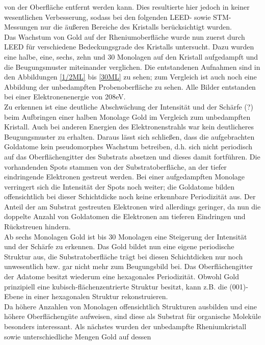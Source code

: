 von der Oberfläche entfernt werden kann. Dies resultierte hier jedoch in keiner wesentlichen
Verbesserung, sodass bei den folgenden LEED- sowie STM-Messungen nur die äußeren Bereiche des
Kristalls berücksichtigt wurden.\\
Das Wachstum von Gold auf der Rheniumoberfläche wurde nun zuerst durch LEED für
verschiedene Bedeckungsgrade des Kristalls untersucht. Dazu wurden eine halbe, eine, sechs, zehn und
30 Monolagen auf den Kristall aufgedampft und die Beugungsmuster miteinander verglichen. Die
entstandenen Aufnahmen sind in den Abbildungen \ref{1/2ML} bis \ref{30ML} zu sehen; zum Vergleich
ist auch noch eine Abbildung der unbedampften Probenoberfläche zu sehen. Alle Bilder entstanden
bei einer Elektronenenergie von 208eV.\\
Zu erkennen ist eine deutliche Abschwächung der Intensität und der Schärfe (?) beim Aufbringen einer
halben Monolage Gold im Vergleich zum unbedampften Kristall. Auch bei anderen Energien des
Elektronenstrahls war kein deutlicheres Beugungsmuster zu erhalten. Daraus lässt sich schließen,
dass die aufgebrachten Goldatome kein pseudomorphes Wachstum betreiben, d.h. sich nicht periodisch
auf das Oberflächengitter des Substrats absetzen und dieses damit fortführen. Die vorhandenden Spots
stammen von der Substratoberfläche, an der tiefer eindringende Elektronen gestreut werden. Bei einer
aufgedampften Monolage verringert sich die Intensität der Spots noch weiter; die Goldatome bilden
offensichtlich bei dieser Schichtdicke noch keine erkennbare Periodizität aus. Der Anteil der am
Substrat gestreuten Elektronen wird allerdings geringer, da nun die doppelte Anzahl von Goldatomen
die Elektronen am tieferen Eindringen und Rückstreuen hindern.\\
Ab sechs Monolagen Gold ist bis 30 Monolagen eine Steigerung der Intensität und der Schärfe zu
erkennen. Das Gold bildet nun eine eigene periodische Struktur aus, die Substratoberfläche trägt
bei diesen Schichtdicken nur noch unwesentlich bzw. gar nicht mehr zum Beugungsbild bei. Das
Oberflächengitter der Adatome besitzt wiederum eine hexagonales Periodizität. Obwohl Gold
prinzipiell eine kubisch-flächenzentrierte Struktur besitzt, kann z.B. die (001)-Ebene in einer
hexagonalen Struktur rekonstruieren.\\
Da höhere Anzahlen von Monolagen offensichtlich Strukturen ausbilden und eine höhere Oberflächengüte
aufweisen, sind diese als Substrat für organische Moleküle besonders interessant. 
\FloatBarrier
Als nächstes wurden der unbedampfte Rheniumkristall sowie unterschiedliche Mengen Gold auf dessen
